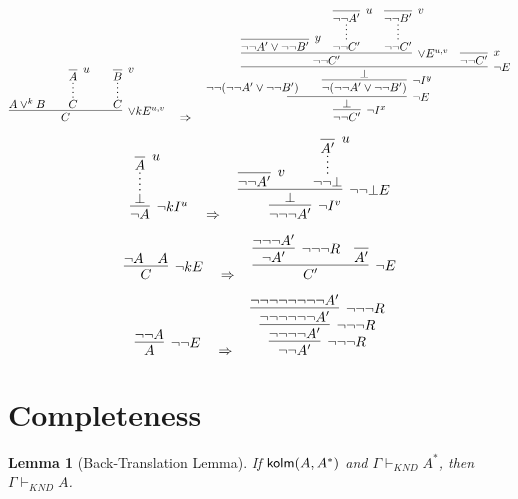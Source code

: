 \documentclass{article}
\newtheorem{lemma}{Lemma}
\begin{document}
\vspace{3em}
\[
\infer[\lor kE^{u,v}]{C}{
    A \lor^k B
    \hspace{2em}
    \infer*[]{C}{\infer[u]{A}{}}
    \hspace{2em}
    \infer*[]{C}{\infer[v]{B}{}}
}
\quad\Rightarrow\quad
\infer[\neg I^x]{\neg\neg C'}{
  \infer[\neg E]{\perp}{
    \neg\neg (\neg\neg A' \lor \neg\neg B') \hspace{-5em}
    \infer[\neg I^y]{\neg (\neg\neg A' \lor \neg\neg B')}{
      \infer[\neg E]{\perp}{
        \infer[\lor E^{u,v}]{\neg\neg C'}{
          {\infer[y]{\neg\neg A' \lor \neg\neg B'}{}} \hspace{1em}
          \infer*[]{\neg\neg C'}{\infer[u]{\neg\neg A'}{}}
          \hspace{1em}
          \infer*[]{\neg\neg C'}{\infer[v]{\neg\neg B'}{}}
        }
        \hspace{1em}
        {\infer[x]{\neg\neg C'}{}}
      }
    }
  }
}
\]

\vspace{3em}
\[
\infer[\neg kI^u]{\neg A}{
  \infer*[]{\bot}{\infer[u]{A}{}}
}
\quad \Rightarrow \quad
\infer[\neg I^v]{\neg\neg\neg A'}{
  \infer[\neg\neg\bot E]{\bot}{
    \infer[v]{\neg\neg A'}{}
    \hspace{2em}
    \infer*[]{\neg\neg\bot}{\infer[u]{A'}{}}
  }
}
\]

\vspace{3em}
\[
\infer[\neg kE]{C}{
  \neg A \quad A
}
\quad \Rightarrow \quad
\infer[\neg E]{C'}{
    \infer[\neg\neg\neg R]{\neg A'}{
      \neg\neg\neg A'
    }
  \quad
  \infer{A'}{}
}
\]



\vspace{3em}
\[
\infer[\neg\neg E]{A}{
    \neg\neg A
}
\quad \Rightarrow \quad
\infer[\neg\neg\neg R]{
  \neg\neg A'
}{
  \infer[\neg\neg\neg R]{
    \neg\neg\neg\neg A'
  }{
    \infer[\neg\neg\neg R]{
      \neg\neg\neg\neg\neg\neg A'
    }{
      \neg\neg\neg\neg\neg\neg\neg\neg A'
    }
  }
}
\]











\section{Completeness}
    \begin{lemma}[Back-Translation Lemma]
    If \(\mathsf{kolm}(A, A^*)\) and \(\Gamma \vdash_{\textit{KND}} A^*\), then \(\Gamma \vdash_{\textit{KND}} A\).
    \end{lemma}
    
\end{document}
